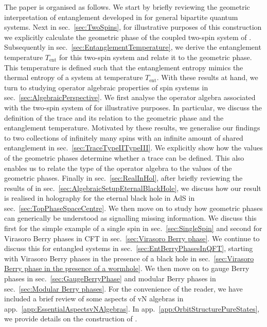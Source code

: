 \documentclass[a4paper,11pt]{article}
\newcommand{\1}{\mathds{1}}
\begin{document}
The paper is organised as follows. We start by briefly reviewing the geometric interpretation of entanglement developed in \cite{Sinolecka2002manifolds} for general bipartite quantum systems. Next in sec.~\ref{sec:TwoSpins}, for illustrative purposes of this construction we explicitly calculate the geometric phase of the coupled two-spin system of \cite{Nogueira:2021ngh}. Subsequently in sec.~\ref{sec:EntanglementTemperature}, we derive the entanglement temperature $T_{\text{ent}}$ for this two-spin system and relate it to the geometric phase. This temperature is defined such that the entanglement entropy mimics the thermal entropy of a system at temperature $T_{\text{ent}}$. With these results at hand, we turn to studying operator algebraic properties of spin systems in sec.~\ref{sec:AlgebraicPerspective}. We first analyse the operator algebra associated with the two-spin system of \cite{Nogueira:2021ngh} for illustrative purposes. In particular, we discuss the definition of the trace and its relation to the geometric phase and the entanglement temperature. Motivated by these results, we generalise our findings to two collections of infinitely many spins with an infinite amount of shared entanglement in sec.~\ref{sec:TraceTypeIITypeIII}. We explicitly show how the values of the geometric phases determine whether a trace can be defined. This also enables us to relate the type of the operator algebra to the values of the geometric phases. Finally in sec.~\ref{sec:RealInHol}, after briefly reviewing the results of \cite{Leutheusser:2021frk,Leutheusser:2021qhd,Witten:2021unn} in sec.~\ref{sec:AlgebraicSetupEternalBlackHole}, we discuss how our result is realised in holography for the eternal black hole in AdS in sec.~\ref{sec:TopPhaseSpaceCentre}. We then move on to study how geometric phases can generically be understood as signalling missing information. We discuss this first for the simple example of a single spin in sec.~\ref{sec:SingleSpin} and second for Virasoro Berry phases in CFT in sec.~\ref{sec:Virasoro Berry phase}. We continue to discuss this for entangled systems in sec.~\ref{sec:EntBerryPhasesInQFT}, starting with Virasoro Berry phases in the presence of a black hole in sec.~\ref{sec:Virasoro Berry phase in the presence of a wormhole}. We then move on to gauge Berry phases in sec.~\ref{sec:GaugeBerryPhase} and modular Berry phases in sec.~\ref{sec:Modular Berry phases}. For the convenience of the reader, we have included a brief review of some aspects of vN algebras in app.~\ref{app:EssentialAspectsvNAlgebras}. In app.~\ref{app:OrbitStructurePureStates}, we provide details on the construction of \cite{Sinolecka2002manifolds}.
\end{document}
